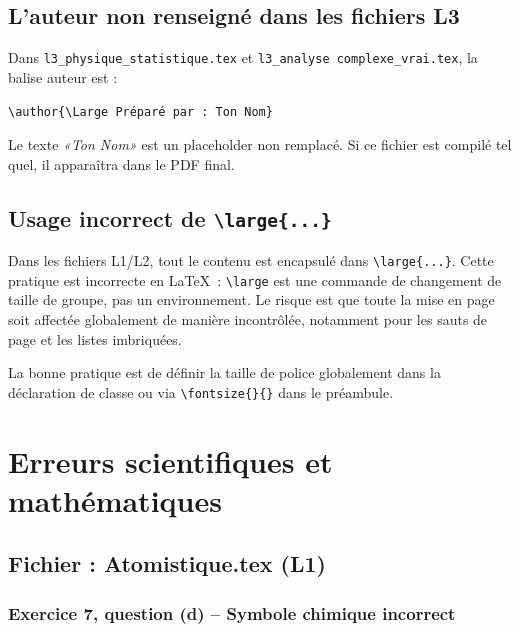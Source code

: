 \documentclass[12pt,a4paper]{article}
\newcommand{\fichier}[1]{\texttt{\small\color{Purple}#1}}
\begin{document}
\subsection{L'auteur non renseigné dans les fichiers L3}

\begin{avertissement}
Dans \fichier{l3\_physique\_statistique.tex} et \fichier{l3\_analyse complexe\_vrai.tex}, la balise auteur est :

\verb|\author{\Large Préparé par : Ton Nom}|

Le texte \textit{«Ton Nom»} est un placeholder non remplacé. Si ce fichier est compilé tel quel, il apparaîtra dans le PDF final.
\end{avertissement}

\subsection{Usage incorrect de \texttt{\textbackslash large\{...\}}}

\begin{avertissement}
Dans les fichiers L1/L2, tout le contenu est encapsulé dans \verb|\large{...}|. Cette pratique est incorrecte en \LaTeX\ : \verb|\large| est une commande de changement de taille de groupe, pas un environnement. Le risque est que toute la mise en page soit affectée globalement de manière incontrôlée, notamment pour les sauts de page et les listes imbriquées.

La bonne pratique est de définir la taille de police globalement dans la déclaration de classe ou via \verb|\fontsize{}{}| dans le préambule.
\end{avertissement}

\section{Erreurs scientifiques et mathématiques}

\subsection{Fichier : Atomistique.tex (L1)}

\subsubsection{Exercice 7, question (d) -- Symbole chimique incorrect}
\end{document}
